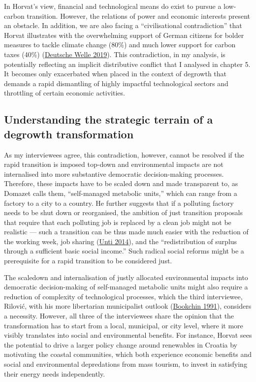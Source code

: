 \documentclass[a4paper, nobind]{templates/ociamthesis}
\begin{document}
In Horvat's view, financial and technological means do exist to pursue a low-carbon transition. However, the relations of power and economic interests present an obstacle. In addition, we are also facing a ``civilisational contradiction'' that Horvat illustrates with the overwhelming support of German citizens for bolder measures to tackle climate change (80\%) and much lower support for carbon taxes (40\%) (\protect\hyperlink{ref-deutsche_welle_most_2019}{Deutsche Welle 2019}). This contradiction, in my analysis, is potentially reflecting an implicit distributive conflict that I analysed in chapter 5. It becomes only exacerbated when placed in the context of degrowth that demands a rapid dismantling of highly impactful technological sectors and throttling of certain economic activities.

\hypertarget{understanding-the-strategic-terrain-of-a-degrowth-transformation}{%
\subsection{Understanding the strategic terrain of a degrowth transformation}\label{understanding-the-strategic-terrain-of-a-degrowth-transformation}}

As my interviewees agree, this contradiction, however, cannot be resolved if the rapid transition is imposed top-down and environmental impacts are not internalised into more substantive democratic decision-making processes. Therefore, these impacts have to be scaled down and made transparent to, as Domazet calls them, ``self-managed metabolic units,'' which can range from a factory to a city to a country. He further suggests that if a polluting factory needs to be shut down or reorganised, the ambition of just transition proposals that require that each polluting job is replaced by a clean job might not be realistic --- such a transition can be thus made much easier with the reduction of the working week, job sharing (\protect\hyperlink{ref-unti_job_2014}{Unti 2014}), and the ``redistribution of surplus through a sufficient basic social income.'' Such radical social reforms might be a prerequisite for a rapid transition to be considered just.

The scaledown and internalisation of justly allocated environmental impacts into democratic decision-making of self-managed metabolic units might also require a reduction of complexity of technological processes, which the third interviewee, Rilović, with his more libertarian municipalist outlook (\protect\hyperlink{ref-bookchin_libertarian_1991}{Bookchin 1991}), considers a necessity. However, all three of the interviewees share the opinion that the transformation has to start from a local, municipal, or city level, where it more visibly translates into social and environmental benefits. For instance, Horvat sees the potential to drive a larger policy change around renewables in Croatia by motivating the coastal communities, which both experience economic benefits and social and environmental depredations from mass tourism, to invest in satisfying their energy needs independently.
\end{document}
